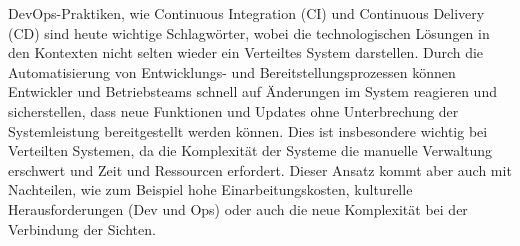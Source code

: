 \documentclass[../vs-script-first-v01.tex]{subfiles}
\begin{document}
DevOps-Praktiken, wie Continuous Integration (CI) und Continuous Delivery (CD) sind heute wichtige Schlagwörter, wobei die technologischen Lösungen in den Kontexten nicht selten wieder ein Verteiltes System darstellen. Durch die Automatisierung von Entwicklungs- und Bereitstellungsprozessen können Entwickler und Betriebsteams schnell auf Änderungen im System reagieren und sicherstellen, dass neue Funktionen und Updates ohne Unterbrechung der Systemleistung bereitgestellt werden können. Dies ist insbesondere wichtig bei Verteilten Systemen, da die Komplexität der Systeme die manuelle Verwaltung erschwert und Zeit und Ressourcen erfordert. Dieser Ansatz kommt aber auch mit Nachteilen, wie zum Beispiel hohe Einarbeitungskosten, kulturelle Herausforderungen (Dev und Ops) oder auch die neue Komplexität bei der Verbindung der Sichten.

\end{document}
